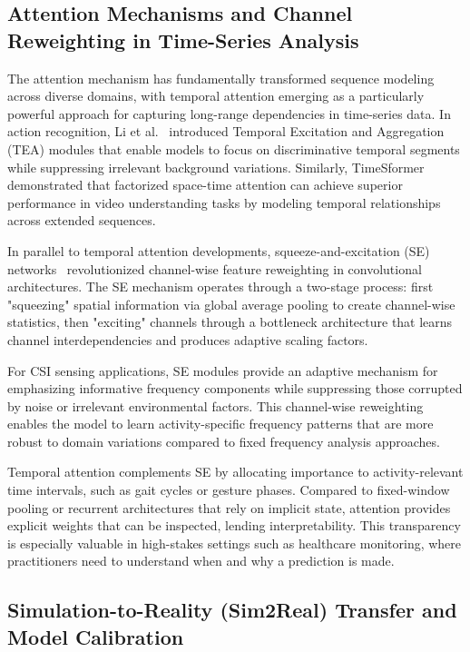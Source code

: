 \documentclass[lettersize,journal]{IEEEtran}
\begin{document}
\subsection{Attention Mechanisms and Channel Reweighting in Time-Series Analysis}

The attention mechanism has fundamentally transformed sequence modeling across diverse domains, with temporal attention emerging as a particularly powerful approach for capturing long-range dependencies in time-series data. In action recognition, Li et al.~\cite{li2020tea} introduced Temporal Excitation and Aggregation (TEA) modules that enable models to focus on discriminative temporal segments while suppressing irrelevant background variations. Similarly, TimeSformer~\cite{bertasius2021timesformer} demonstrated that factorized space-time attention can achieve superior performance in video understanding tasks by modeling temporal relationships across extended sequences.

In parallel to temporal attention developments, squeeze-and-excitation (SE) networks~\cite{se_networks2018} revolutionized channel-wise feature reweighting in convolutional architectures. The SE mechanism operates through a two-stage process: first "squeezing" spatial information via global average pooling to create channel-wise statistics, then "exciting" channels through a bottleneck architecture that learns channel interdependencies and produces adaptive scaling factors.

For CSI sensing applications, SE modules provide an adaptive mechanism for emphasizing informative frequency components while suppressing those corrupted by noise or irrelevant environmental factors. This channel-wise reweighting enables the model to learn activity-specific frequency patterns that are more robust to domain variations compared to fixed frequency analysis approaches.

Temporal attention complements SE by allocating importance to activity-relevant time intervals, such as gait cycles or gesture phases. Compared to fixed-window pooling or recurrent architectures that rely on implicit state, attention provides explicit weights that can be inspected, lending interpretability. This transparency is especially valuable in high-stakes settings such as healthcare monitoring, where practitioners need to understand when and why a prediction is made.

\subsection{Simulation-to-Reality (Sim2Real) Transfer and Model Calibration}
\end{document}
